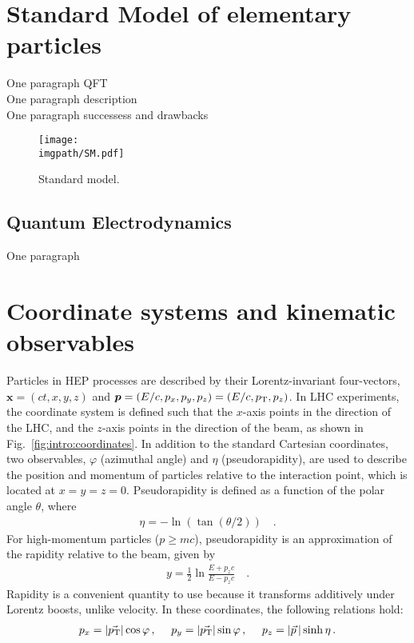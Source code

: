 \def \imgpath {"./figures/intro"}
\section{Standard Model of elementary particles}

One paragraph QFT\\
One paragraph description\\
One paragraph successess and drawbacks

\begin{figure}[H]
\texttt{[image: \\imgpath/SM.pdf]}
\caption{Standard model.}
\end{figure}

\subsection{Quantum Electrodynamics}

One paragraph

\section{Coordinate systems and kinematic observables}

Particles in HEP processes are described by their Lorentz-invariant four-vectors, $\bm{x} = (ct, x, y, z)$ and $\bm{p} = (E/c, p_x, p_y, p_z) = (E/c, p_{\text{T}}, p_z)$. In LHC experiments, the coordinate system is defined such that the $x$-axis points in the direction of the LHC, and the $z$-axis points in the direction of the beam, as shown in Fig.~\ref{fig:intro:coordinates}. In addition to the standard Cartesian coordinates, two observables, $\varphi$ (azimuthal angle) and $\eta$ (pseudorapidity), are used to describe the position and momentum of particles relative to the interaction point, which is located at $x = y = z = 0$. Pseudorapidity is defined as a function of the polar angle $\theta$, where 
\begin{align}
\eta = -\ln(\tan(\theta/2)) \quad .
\end{align}
For high-momentum particles ($p \geq mc$), pseudorapidity is an approximation of the rapidity relative to the beam, given by 
\begin{align}
y = \frac{1}{2} \ln \frac{E + p_z c}{E - p_z c} \quad .
\end{align}
Rapidity is a convenient quantity to use because it transforms additively under Lorentz boosts, unlike velocity. In these coordinates, the following relations hold:
\begin{align}
p_x = |\vec{p_{\text{T}}}| \cos \varphi \, , \quad \
p_y = |\vec{p_{\text{T}}}| \sin \varphi \, , \quad \
p_z = |\vec{p} \,| \sinh \eta \, .
\end{align}

